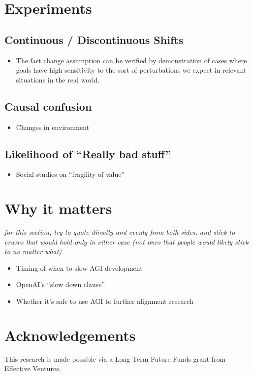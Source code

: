 \documentclass{article}
\begin{document}
\section{Experiments}
\subsection{Continuous / Discontinuous Shifts}
\begin{itemize}
    \item The fast change assumption can be verified by demonstration of cases where goals have high sensitivity to the sort of perturbations we expect in relevant situations in the real world.
\end{itemize}

\subsection{Causal confusion}
\begin{itemize}
    \item Changes in environment
\end{itemize}

\subsection{Likelihood of “Really bad stuff”}
\begin{itemize}
    \item Social studies on “fragility of value”
\end{itemize}

\section{Why it matters}
\emph{for this section, try to quote directly and evenly from both sides, and stick to cruxes that would hold only in either case (not ones that people would likely stick to no matter what)}
\begin{itemize}
    \item Timing of when to slow AGI development
    \item OpenAI’s “slow down clause”
    \item Whether it’s safe to use AGI to further alignment research
\end{itemize}


\section{Acknowledgements}
This research is made possible via a Long-Term Future Funds grant from Effective Ventures.
\end{document}
